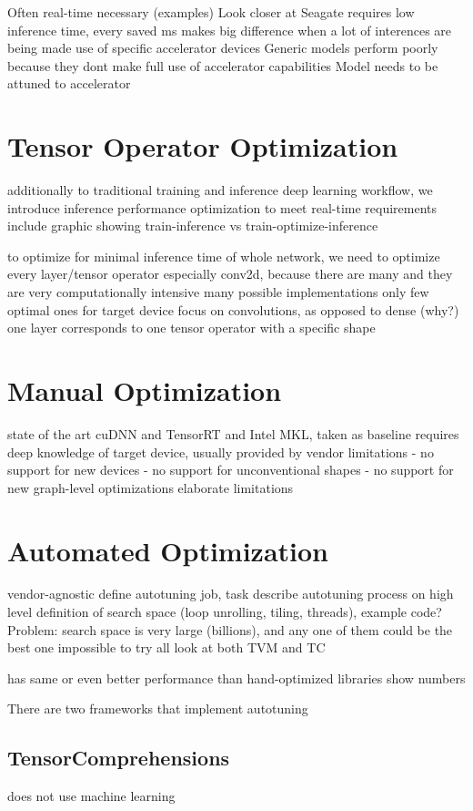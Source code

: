 Often real-time necessary (examples)
Look closer at Seagate
requires low inference time, every saved ms makes big difference when a lot of interences are being made
use of specific accelerator devices
Generic models perform poorly because they dont make full use of accelerator capabilities
Model needs to be attuned to accelerator

\section{Tensor Operator Optimization}
additionally to traditional training and inference deep learning workflow, we introduce inference performance optimization to meet real-time requirements
include graphic showing train-inference vs train-optimize-inference

to optimize for minimal inference time of whole network, we need to optimize every layer/tensor operator
especially conv2d, because there are many and they are very computationally intensive
many possible implementations
only few optimal ones for target device
focus on convolutions, as opposed to dense (why?)
one layer corresponds to one tensor operator with a specific shape

\section{Manual Optimization}
state of the art cuDNN and TensorRT and Intel MKL, taken as baseline
requires deep knowledge of target device, usually provided by vendor
limitations
- no support for new devices
- no support for unconventional shapes
- no support for new graph-level optimizations
elaborate limitations

\section{Automated Optimization}
vendor-agnostic
define autotuning job, task
describe autotuning process on high level
definition of search space (loop unrolling, tiling, threads), example code?
Problem: search space is very large (billions), and any one of them could be the best one
impossible to try all
look at both TVM and TC

has same or even better performance than hand-optimized libraries
show numbers

There are two frameworks that implement autotuning

\subsection{TensorComprehensions}
does not use machine learning

